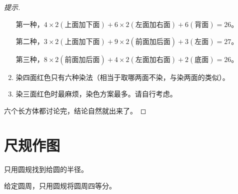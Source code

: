 \begin{proof}[提示]
\begin{enumerate}
    第一种，$4\times2(\text{上面加下面})+6\times2(\text{左面加右面})+6(\text{背面})=26$。

    第二种，$3\times2(\text{上面加下面})+9\times2(\text{前面加后面})+3(\text{左面})=27$。

    第三种，$8\times2(\text{前面加后面})+4\times2(\text{左面加右面})+2(\text{底面})=26$。

  \item 染四面红色只有六种染法（相当于取哪两面不染，与染两面的类似）。
  \item 染三面红色时最麻烦，染色方案最多。请自行考虑。
  \end{enumerate}

  六个长方体都讨论完，结论自然就出来了。
\end{proof}

\section{尺规作图}
\label{sec:draw-with-ruler}

\begin{example}
  只用圆规找到给圆的半径。
\end{example}

\begin{example}[上海，1956]
  给定圆周，只用圆规将圆周四等分。
\end{example}